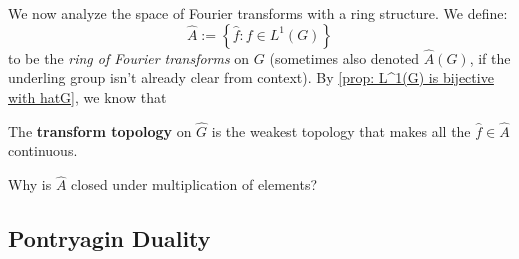 \documentclass[11pt, x11names, openany]{book}
\newcommand{\set}[1]{\left\{ #1 \right\}}
\renewcommand{\hat}{\widehat}
\begin{document}
We now analyze the space of Fourier transforms with a ring structure. We define:
\begin{equation*}
    \hat{A} := \set{\hat{f} : f \in L^1(G)}
\end{equation*}
to be the \textit{ring of Fourier transforms} on $G$ (sometimes also denoted $\hat{A}(G)$, if the underling group isn't already clear from context). By \ref{prop: L^1(G) is bijective with hatG}, we know that 
\begin{defn}
    The \textbf{transform topology} on $\hat{G}$ is the weakest topology that makes all the $\hat{f} \in \hat{A}$ continuous.
\end{defn}
\begin{sanitycheck}
    Why is $\hat{A}$ closed under multiplication of elements?
\end{sanitycheck}



\subsection{Pontryagin Duality}
\label{subsection: Pontryagin Duality}


\printbibliography
\end{document}
